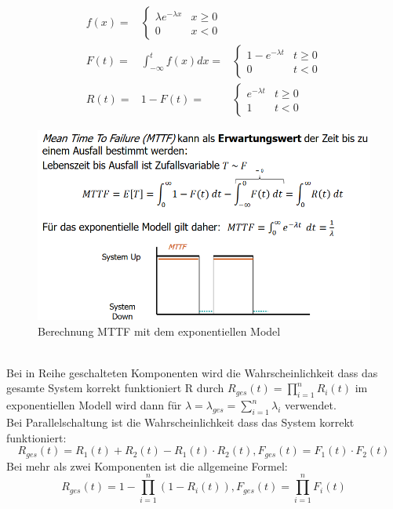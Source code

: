 \documentclass[a4paper,12pt]{article}
\begin{document}
\begin{align*}
f(x) = &
\begin{cases} 
	\lambda e^{-\lambda x} & x\geq 0\\
	 0 & x < 0
\end{cases} \\
F(t) = & \int_{-\infty}^t f(x)dx = &
\begin{cases}
1 -e^{-\lambda t} & t \geq 0\\
0 & t < 0
\end{cases}\\
R(t) = & 1 -F(t) = & 
\begin{cases}
e^{-\lambda t} & t \geq 0\\
1 & t< 0
\end{cases}
\end{align*}
\begin{figure}[h!]
\centering
\includegraphics[scale=0.6]{Grafiken/MTTF-Model.png}
\caption{Berechnung MTTF mit dem exponentiellen Model}
\end{figure}\\
Bei in Reihe geschalteten Komponenten wird die Wahrscheinlichkeit dass das gesamte System korrekt funktioniert R durch $R_{ges}(t)=\prod^n_{i=1}R_i(t)$ im exponentiellen Modell wird dann für $\lambda = \lambda_{ges}=\sum_{i=1}^n\lambda_i$ verwendet.\\
Bei Parallelschaltung ist die Wahrscheinlichkeit dass das System korrekt funktioniert:
$$R_{ges}(t)=R_1(t)+R_2(t)-R_1(t)\cdot R_2(t), F_{ges}(t)=F_1(t)\cdot F_2(t)$$
Bei mehr als zwei Komponenten ist die allgemeine Formel:
$$R_{ges}(t)=1-\prod_{i=1}^n(1-R_i(t)), F_{ges}(t)=\prod_{i=1}^nF_i(t)$$
\end{document}
